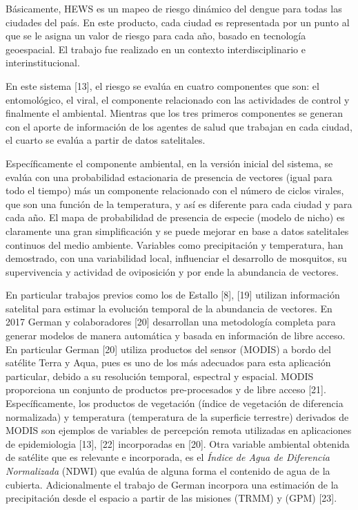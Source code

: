 Básicamente, HEWS es un mapeo de riesgo dinámico del dengue para todas las
ciudades del país. En este producto, cada ciudad es representada por un punto
al que se le asigna un valor de riesgo para cada año, basado en tecnología
geoespacial. El trabajo fue realizado en un contexto interdisciplinario e
interinstitucional.

En este sistema [13], el riesgo se evalúa en cuatro componentes que son: el
entomológico, el viral, el componente relacionado con las actividades de
control y finalmente el ambiental. Mientras que los tres primeros componentes
se generan con el aporte de información de los agentes de salud que trabajan en cada
ciudad, el cuarto se evalúa a partir de datos satelitales.

Específicamente el componente ambiental, en la versión inicial del sistema, se
evalúa con una probabilidad estacionaria de presencia de vectores (igual para
todo el tiempo) más un componente relacionado con el número de ciclos virales,
que son una función de la temperatura, y así es diferente para cada ciudad y
para cada año. El mapa de probabilidad de presencia de especie (modelo de nicho)
es claramente una gran simplificación y se puede mejorar en base a datos
satelitales continuos del medio ambiente. Variables como precipitación y
temperatura, han demostrado, con una variabilidad local, influenciar el
desarrollo de mosquitos, su supervivencia y actividad de oviposición y por ende
la abundancia de vectores.

En particular trabajos previos como los de Estallo [8], [19] utilizan información
satelital para estimar la evolución temporal de la abundancia de vectores.
En 2017 German y colaboradores [20] desarrollan una metodología completa
para generar modelos de manera automática y basada en información de libre
acceso. En particular German [20] utiliza productos del sensor (MODIS) a bordo
del satélite Terra y Aqua, pues es uno de los más adecuados para esta
aplicación particular, debido a su resolución temporal, espectral y espacial.
MODIS proporciona un conjunto de productos pre-procesados y de libre acceso [21].
Específicamente, los productos de vegetación (índice de vegetación de diferencia
normalizada) y temperatura (temperatura de la superficie terrestre) derivados
de MODIS son ejemplos de variables de percepción remota utilizadas
en aplicaciones de epidemiologia [13], [22] incorporadas en [20]. Otra variable
ambiental obtenida de satélite que es relevante e incorporada, es el
\textit{Índice de Agua de Diferencia Normalizada} (NDWI) que evalúa de alguna
forma el contenido de agua de la cubierta. Adicionalmente el trabajo de German
incorpora una estimación de la precipitación desde el espacio a partir de las
misiones (TRMM) y (GPM) [23].



